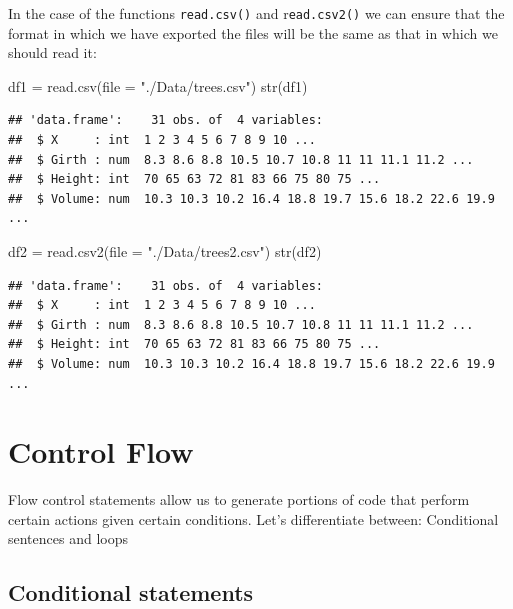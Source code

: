 \documentclass[
]{book}
\newenvironment{Shaded}{\begin{snugshade}}{\end{snugshade}}
\newcommand{\AttributeTok}[1]{\textcolor[rgb]{0.77,0.63,0.00}{#1}}
\newcommand{\FunctionTok}[1]{\textcolor[rgb]{0.00,0.00,0.00}{#1}}
\newcommand{\NormalTok}[1]{#1}
\newcommand{\OtherTok}[1]{\textcolor[rgb]{0.56,0.35,0.01}{#1}}
\newcommand{\StringTok}[1]{\textcolor[rgb]{0.31,0.60,0.02}{#1}}
\theoremstyle{definition}
\theoremstyle{definition}
\theoremstyle{definition}
\theoremstyle{definition}
\theoremstyle{remark}
\begin{document}
In the case of the functions \texttt{read.csv()} and r\texttt{ead.csv2()} we can ensure that the format in which we have exported the files will be the same as that in which we should read it:

\begin{Shaded}
\begin{Highlighting}[]
\NormalTok{df1 }\OtherTok{=} \FunctionTok{read.csv}\NormalTok{(}\AttributeTok{file =} \StringTok{"./Data/trees.csv"}\NormalTok{)}
\FunctionTok{str}\NormalTok{(df1)}
\end{Highlighting}
\end{Shaded}

\begin{verbatim}
## 'data.frame':    31 obs. of  4 variables:
##  $ X     : int  1 2 3 4 5 6 7 8 9 10 ...
##  $ Girth : num  8.3 8.6 8.8 10.5 10.7 10.8 11 11 11.1 11.2 ...
##  $ Height: int  70 65 63 72 81 83 66 75 80 75 ...
##  $ Volume: num  10.3 10.3 10.2 16.4 18.8 19.7 15.6 18.2 22.6 19.9 ...
\end{verbatim}

\begin{Shaded}
\begin{Highlighting}[]
\NormalTok{df2 }\OtherTok{=} \FunctionTok{read.csv2}\NormalTok{(}\AttributeTok{file =} \StringTok{"./Data/trees2.csv"}\NormalTok{)}
\FunctionTok{str}\NormalTok{(df2)}
\end{Highlighting}
\end{Shaded}

\begin{verbatim}
## 'data.frame':    31 obs. of  4 variables:
##  $ X     : int  1 2 3 4 5 6 7 8 9 10 ...
##  $ Girth : num  8.3 8.6 8.8 10.5 10.7 10.8 11 11 11.1 11.2 ...
##  $ Height: int  70 65 63 72 81 83 66 75 80 75 ...
##  $ Volume: num  10.3 10.3 10.2 16.4 18.8 19.7 15.6 18.2 22.6 19.9 ...
\end{verbatim}

\hypertarget{control-flow}{%
\section{Control Flow}\label{control-flow}}

Flow control statements allow us to generate portions of code that perform certain actions given certain conditions. Let's differentiate between: Conditional sentences and loops

\hypertarget{conditional-statements}{%
\subsection{Conditional statements}\label{conditional-statements}}
\end{document}
